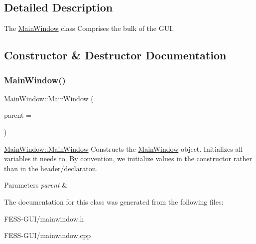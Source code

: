 \subsection{Detailed Description}
The \hyperlink{class_main_window}{Main\+Window} class Comprises the bulk of the G\+UI. 

\subsection{Constructor \& Destructor Documentation}
\hypertarget{class_main_window_a8b244be8b7b7db1b08de2a2acb9409db}{}\label{class_main_window_a8b244be8b7b7db1b08de2a2acb9409db} 
\subsubsection{\texorpdfstring{Main\+Window()}{MainWindow()}}
{\footnotesize\ttfamily Main\+Window\+::\+Main\+Window (\begin{DoxyParamCaption}\item[{Q\+Widget $\ast$}]{parent = {} }\end{DoxyParamCaption})\hspace{0.3cm}{\ttfamily [explicit]}}



\hyperlink{class_main_window_a8b244be8b7b7db1b08de2a2acb9409db}{Main\+Window\+::\+Main\+Window} Constructs the \hyperlink{class_main_window}{Main\+Window} object. Initializes all variables it needs to. By convention, we initialize values in the constructor rather than in the header/declaraton. 


\begin{DoxyParams}{Parameters}
{\em parent} & \\
\hline
\end{DoxyParams}


The documentation for this class was generated from the following files\+:\begin{DoxyCompactItemize}
\item 
F\+E\+S\+S-\/\+G\+U\+I/mainwindow.\+h\item 
F\+E\+S\+S-\/\+G\+U\+I/mainwindow.\+cpp\end{DoxyCompactItemize}
